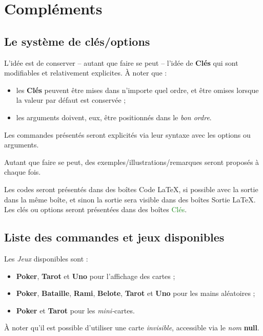 \documentclass[a4paper]{article}
\newcommand\Cle[1]{{\bfseries\sffamily\textlangle #1\textrangle}}
\begin{document}
\section{Compléments}

\subsection{Le système de \og clés/options \fg}

\begin{codeidee}
L'idée est de conserver -- autant que faire se peut -- l'idée de \Cle{Clés} qui sont modifiables et relativement explicites. À noter que :
%
\begin{itemize}[leftmargin=*]
	\item les \Cle{Clés} peuvent être mises dans n'importe quel ordre, et être omises lorsque la valeur par défaut est conservée ;
	\item les \textsf{arguments} doivent, eux, être positionnés dans le \textit{bon ordre}.
\end{itemize}
\end{codeidee}

\begin{codeinfo}
Les \textsf{commandes} présentés seront explicités via leur \textsf{syntaxe} avec les \textsf{options} ou \textsf{arguments}.

Autant que faire se peut, des exemples/illustrations/remarques seront proposés à chaque fois.

\smallskip

Les \textsf{codes} seront présentés dans des \textsf{boîtes} \textcolor{red!75!black}{{\small \faCode} Code \LaTeX}, si possible avec la \textsf{sortie} dans la même boîte, et sinon la \textsf{sortie} sera visible dans des \textsf{boîtes} \textcolor{red!75!black}{{\small \faArrowAltCircleRight[regular]} Sortie \LaTeX}. Les \textsf{clés} ou \textsf{options} seront présentées dans des \textsf{boîtes} \textcolor{ForestGreen}{{\small \faPaperclip} Clés}.
\end{codeinfo}

\subsection{Liste des commandes et jeux disponibles}

\begin{codeinfo}
Les \textit{Jeux} disponibles sont :

\begin{itemize}
	\item \Cle{Poker}, \Cle{Tarot} et \Cle{Uno} pour l'affichage des cartes ;
	\item \Cle{Poker}, \Cle{Bataille}, \Cle{Rami}, \Cle{Belote}, \Cle{Tarot}  et \Cle{Uno} pour les mains aléatoires ;
	\item \Cle{Poker} et \Cle{Tarot} pour les \textit{mini-}cartes.
\end{itemize}

À noter qu'il est possible d'utiliser une carte \textit{invisible}, accessible via le \textit{nom} \Cle{null}.
\end{codeinfo}
\end{document}
